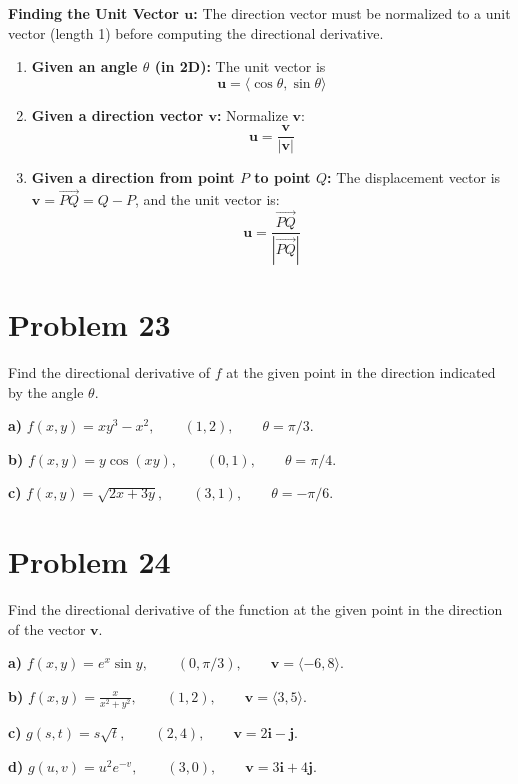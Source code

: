 \documentclass[11pt]{article}
\begin{document}
\textbf{Finding the Unit Vector $\mathbf{u}$:}
The direction vector must be normalized to a unit vector (length 1) before computing the directional derivative.
\begin{enumerate}
    \item \textbf{Given an angle $\theta$ (in 2D):} The unit vector is
    \[
    \mathbf{u} = \langle \cos\theta, \sin\theta \rangle
    \]
    \item \textbf{Given a direction vector $\mathbf{v}$:} Normalize $\mathbf{v}$:
    \[
    \mathbf{u} = \frac{\mathbf{v}}{|\mathbf{v}|}
    \]
    \item \textbf{Given a direction from point $P$ to point $Q$:} The displacement vector is $\mathbf{v} = \overrightarrow{PQ} = Q - P$, and the unit vector is:
    \[
    \mathbf{u} = \frac{\overrightarrow{PQ}}{|\overrightarrow{PQ}|}
    \]
\end{enumerate}

\hrulefill

\section*{Problem 23}

Find the directional derivative of $f$ at the given point in the direction indicated by the angle $\theta$.

\textbf{a)} $f(x,y) = xy^3 - x^2, \qquad (1,2), \qquad \theta = \pi/3$.

\textbf{b)} $f(x,y) = y\cos(xy), \qquad (0,1), \qquad \theta = \pi/4$.

\textbf{c)} $f(x,y) = \sqrt{2x + 3y}, \qquad (3,1), \qquad \theta = -\pi/6$.


\section*{Problem 24}

Find the directional derivative of the function at the given point in the direction of the vector $\mathbf{v}$.

\textbf{a)} $f(x,y) = e^x \sin y, \qquad (0,\pi/3), \qquad \mathbf{v} = \langle -6, 8 \rangle$.

\textbf{b)} $f(x,y) = \frac{x}{x^2 + y^2}, \qquad (1,2), \qquad \mathbf{v} = \langle 3, 5 \rangle$.

\textbf{c)} $g(s,t) = s\sqrt{t}, \qquad (2,4), \qquad \mathbf{v} = 2\mathbf{i} - \mathbf{j}$.

\textbf{d)} $g(u,v) = u^2 e^{-v}, \qquad (3,0), \qquad \mathbf{v} = 3\mathbf{i} + 4\mathbf{j}$.
\end{document}
